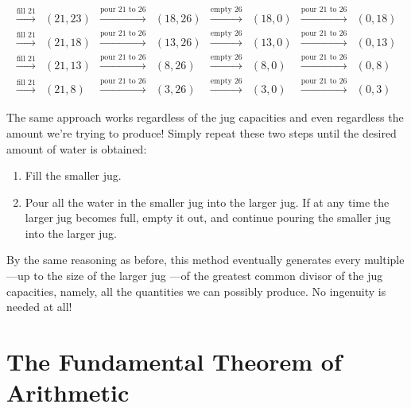 \[\begin{array}{cccccccc}
\xrightarrow{\text{fill 21}} & (21,23)& \xrightarrow{\text{pour 21 to
    26}} & (18,26)& \xrightarrow{\text{empty 26}} & (18,0)& \xrightarrow{\text{pour 21 to
    26}} & (0,18)\\
\xrightarrow{\text{fill 21}} & (21,18)& \xrightarrow{\text{pour 21 to
    26}} & (13,26)& \xrightarrow{\text{empty 26}} & (13,0)& \xrightarrow{\text{pour 21 to
    26}} & (0,13)\\
\xrightarrow{\text{fill 21}} & (21,13)& \xrightarrow{\text{pour 21 to
    26}} & (8,26)& \xrightarrow{\text{empty 26}} & (8,0)& \xrightarrow{\text{pour 21 to
    26}} & (0,8)\\
\xrightarrow{\text{fill 21}} & (21,8)& \xrightarrow{\text{pour 21 to
    26}} & (3,26)& \xrightarrow{\text{empty 26}} & (3,0)& \xrightarrow{\text{pour 21 to
    26}} & (0,3)
\end{array}
\]

The same approach works regardless of the jug capacities and even regardless the amount
we're trying to produce!  Simply repeat these two steps until the desired amount of water
is obtained:
\begin{enumerate}
\item Fill the smaller jug.

\item Pour all the water in the smaller jug into the larger jug.  If at any time the larger
  jug becomes full, empty it out, and continue pouring the smaller jug into the larger jug.
\end{enumerate}
By the same reasoning as before, this method eventually generates every multiple ---up to
the size of the larger jug ---of the greatest common divisor of the jug capacities, namely,
all the quantities we can possibly produce.  No ingenuity is needed at all!

\begin{problems}

\practiceproblems
{}

\classproblems
{}

\homeworkproblems
{}

\end{problems}


\section{The Fundamental Theorem of Arithmetic}\label{fundamental_theorem_sec}

